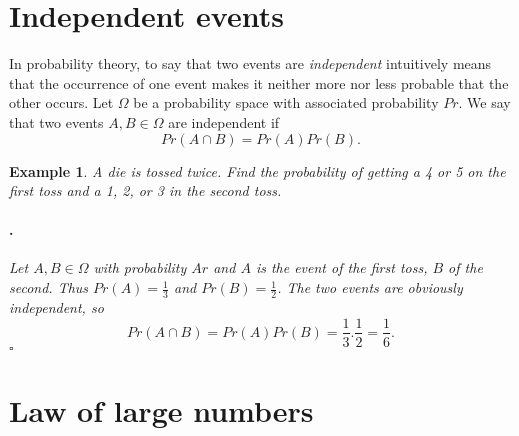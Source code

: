 \documentclass[12pt, a4paper,leqno]{report}
\newenvironment{solution}{\paragraph{\normalfont{\textit{Solution}}.}}{\hfill\null$\square$}
\theoremstyle{normal}
\theoremstyle{normal}
\newtheorem{example}{Example}[chapter]
\begin{document}
	\section{Independent events}
	In probability theory, to say that two events are \textit{independent} intuitively means that the occurrence of one event makes it neither more nor less probable that the other occurs.
	Let $\Omega$ be a probability space with associated probability $Pr$.
	We say that two events $A, B\in\Omega$ are independent if
	\[ Pr(A\cap B) = Pr(A)Pr(B). \]
	
	\begin{example}
		A die is tossed twice. Find the probability of getting a 4 or 5 on the first toss and a 1, 2, or 3 in the second toss.
		\begin{solution}
			Let $A, B\in\Omega$ with probability $Ar$ and $A$ is the event of the first toss, $B$ of the second. Thus $Pr(A) = \frac{1}{3}$ and $Pr(B) = \frac{1}{2}$. The two events are obviously independent, so
			\[ Pr(A\cap B) = Pr(A)Pr(B) = \frac{1}{3}.\frac{1}{2} = \frac{1}{6}. \] 
		\end{solution}
	\end{example}
	
	\section{Law of large numbers}
	
\end{document}
